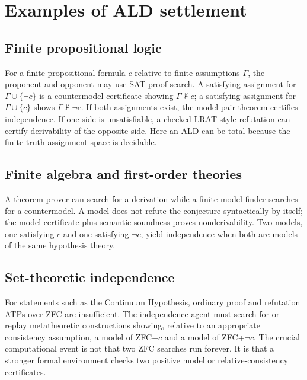 \documentclass[11pt]{article}
\theoremstyle{definition}
\theoremstyle{remark}
\newcommand{\Gammaa}{\Gamma}
\begin{document}
\section{Examples of ALD settlement}

\subsection{Finite propositional logic}
For a finite propositional formula $c$ relative to finite assumptions $\Gammaa$, the proponent and opponent may use SAT proof search. A satisfying assignment for $\Gammaa\cup\{\neg c\}$ is a countermodel certificate showing $\Gammaa\nvdash c$; a satisfying assignment for $\Gammaa\cup\{c\}$ shows $\Gammaa\nvdash\neg c$. If both assignments exist, the model-pair theorem certifies independence. If one side is unsatisfiable, a checked LRAT-style refutation can certify derivability of the opposite side. Here an ALD can be total because the finite truth-assignment space is decidable.

\subsection{Finite algebra and first-order theories}
A theorem prover can search for a derivation while a finite model finder searches for a countermodel. A model does not refute the conjecture syntactically by itself; the model certificate plus semantic soundness proves nonderivability. Two models, one satisfying $c$ and one satisfying $\neg c$, yield independence when both are models of the same hypothesis theory.

\subsection{Set-theoretic independence}
For statements such as the Continuum Hypothesis, ordinary proof and refutation ATPs over ZFC are insufficient. The independence agent must search for or replay metatheoretic constructions showing, relative to an appropriate consistency assumption, a model of ZFC+$c$ and a model of ZFC+$\neg c$. The crucial computational event is not that two ZFC searches run forever. It is that a stronger formal environment checks two positive model or relative-consistency certificates.
\end{document}
